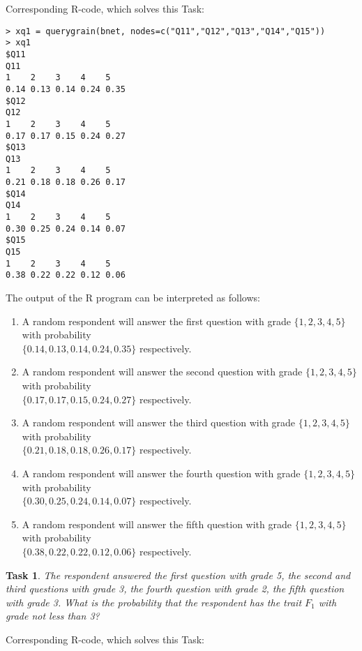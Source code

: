 \documentclass[12pt]{article}
\newtheorem{task}{Task}[section]
\begin{document}
Corresponding R-code, which solves this Task:
\begin{verbatim}
> xq1 = querygrain(bnet, nodes=c("Q11","Q12","Q13","Q14","Q15"))
> xq1
$Q11
Q11
1    2    3    4    5 
0.14 0.13 0.14 0.24 0.35 
$Q12
Q12
1    2    3    4    5 
0.17 0.17 0.15 0.24 0.27 
$Q13
Q13
1    2    3    4    5 
0.21 0.18 0.18 0.26 0.17 
$Q14
Q14
1    2    3    4    5 
0.30 0.25 0.24 0.14 0.07 
$Q15
Q15
1    2    3    4    5 
0.38 0.22 0.22 0.12 0.06
\end{verbatim}
%
%
The output of the R program can be interpreted as follows:
\begin{enumerate}
\item 
A random respondent will answer the first question with grade $\{1, 2, 3, 4, 5\}$ with probability \\$\{0.14, 0.13, 0.14, 0.24, 0.35\}$ respectively.
\item 
A random respondent will answer the second question  with grade $\{1, 2, 3, 4, 5\}$ with probability \\$\{0.17, 0.17, 0.15, 0.24, 0.27\}$ respectively.
\item 
A random respondent will answer the third question with grade $\{1, 2, 3, 4, 5\}$ with probability \\$\{0.21, 0.18, 0.18, 0.26, 0.17\}$ respectively.
\item 
A random respondent will answer the fourth question with grade $\{1, 2, 3, 4, 5\}$ with probability \\$\{0.30, 0.25, 0.24, 0.14, 0.07\}$ respectively.
\item 
A random respondent will answer the fifth question with grade $\{1, 2, 3, 4, 5\}$ with probability \\$\{0.38, 0.22, 0.22, 0.12, 0.06\}$ respectively.
\end{enumerate}

\begin{task}
\label{t:2quest3}
The respondent answered the first question with grade 5, the second and third questions with grade 3, the fourth question with grade 2, the fifth question with grade 3. What is the probability that the respondent has the trait $F_1$ with grade not less than 3? 
\end{task}
%
Corresponding R-code, which solves this Task:
\end{document}
